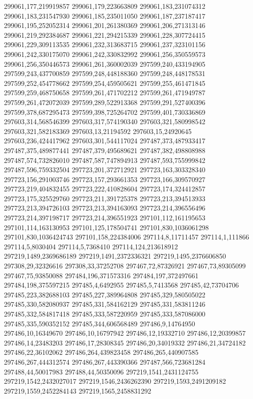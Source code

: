 299061,177,219919857
299061,179,223663809
299061,183,231074312
299061,183,231547930
299061,185,235011050
299061,187,237187417
299061,195,252052314
299061,201,261380369
299061,206,271313146
299061,219,292384687
299061,221,294215339
299061,228,307724415
299061,229,309113535
299061,232,313683715
299061,237,323101156
299061,242,330175070
299061,242,330832992
299061,256,350559573
299061,256,350446573
299061,261,360002039
297599,240,433194905
297599,243,437700859
297599,248,448188360
297599,248,448178531
297599,252,454778662
297599,254,459505621
297599,255,461471845
297599,259,468750658
297599,261,471702212
297599,261,471949787
297599,261,472072039
297599,289,522913368
297599,291,527400396
297599,378,687295473
297599,398,725264702
297599,401,730336869
297603,314,568546399
297603,317,574190340
297603,321,580998542
297603,321,582183369
297603,13,21194592
297603,15,24920645
297603,236,424417962
297603,301,544117024
297487,373,487933417
297487,375,489877441
297487,379,495689621
297487,382,498808988
297487,574,732826010
297487,587,747894913
297487,593,755999842
297487,596,759332504
297723,201,372712921
297723,163,303328340
297723,156,291003746
297723,157,293661353
297723,166,309570927
297723,219,404832455
297723,222,410828604
297723,174,324412857
297723,175,325529760
297723,211,391725378
297723,213,394513933
297723,213,394726103
297723,213,394163093
297723,214,396556496
297723,214,397198717
297723,214,396551923
297101,112,161195653
297101,114,163130953
297101,125,178504741
297101,830,1036061298
297101,830,1036424743
297101,158,224384006
297114,8,11711457
297114,1,111866
297114,5,8030404
297114,5,7368410
297114,124,213618912
297219,1489,2369686189
297219,1491,2372336321
297219,1495,2376606850
297308,29,32326616
297308,33,37252708
297467,72,87326921
297467,73,89305099
297467,75,93850088
297484,196,371573316
297484,197,372497661
297484,198,375597215
297485,4,6492955
297485,5,7413568
297485,42,73704706
297485,223,382688103
297485,227,389964808
297485,329,580505022
297485,330,582080937
297485,331,584162129
297485,331,583811246
297485,332,584817418
297485,333,587220959
297485,333,587086000
297485,335,590352152
297485,344,606568489
297486,9,14764950
297486,10,16349670
297486,10,16797942
297486,12,19332710
297486,12,20399857
297486,14,23483203
297486,17,28308345
297486,20,34019332
297486,21,34724182
297486,22,36102062
297486,264,439823458
297486,265,440907585
297486,267,444312574
297486,267,443390366
297487,566,723681284
297488,44,50017983
297488,44,50350096
297219,1541,2431124755
297219,1542,2432027017
297219,1546,2436262390
297219,1593,2491209182
297219,1559,2452284143
297219,1565,2458831292
